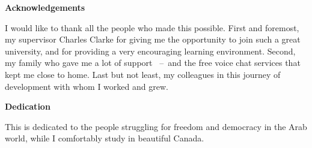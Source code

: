 \cleardoublepage


\begin{center}\textbf{Acknowledgements}\end{center}
I would like to thank all the people who made this possible.
First and foremost, my supervisor Charles Clarke for giving me
the opportunity to join such a great university,
and for providing a very encouraging learning environment.
Second, my family who gave me a lot of support
~--~and the free voice chat services 
that kept me close to home.
Last but not least, my colleagues in this journey of
development with whom I worked and grew.
 

\cleardoublepage


\begin{center}\textbf{Dedication}\end{center}

This is dedicated to the people struggling for freedom and democracy in the Arab world, while I comfortably study in beautiful Canada.
\cleardoublepage

\renewcommand\contentsname{Table of Contents}
\tableofcontents
\cleardoublepage
{}

\listoftables
\cleardoublepage
{}		%

\listoffigures
\cleardoublepage
{}		%



